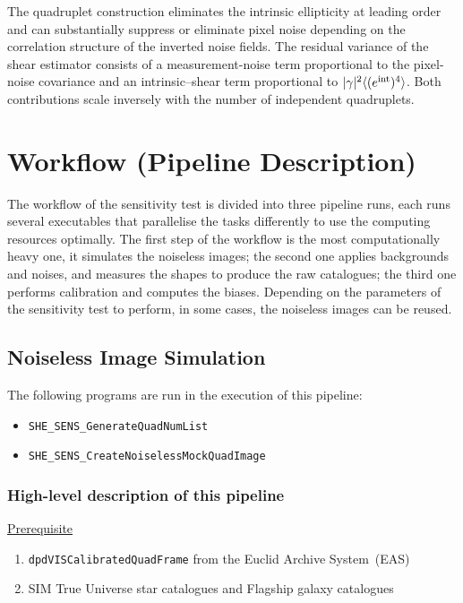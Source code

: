 \documentclass[11pt]{EuclidVIS}
\numberwithin{table}{section}
\numberwithin{figure}{section}
\begin{document}
The quadruplet construction eliminates the intrinsic ellipticity at leading
order and can substantially suppress or eliminate pixel noise depending on
the correlation structure of the inverted noise fields.
The residual variance of the shear estimator consists of a measurement-noise
term proportional to the pixel-noise covariance and an intrinsic--shear
term proportional to $|\gamma|^2\langle (e^{\rm int})^4\rangle$.
Both contributions scale inversely with the number of independent quadruplets.


\section{Workflow (Pipeline Description)}
\label{sec:workflow}
The workflow of the sensitivity test is divided into three pipeline runs, each runs several
executables that parallelise the tasks differently to use the computing resources optimally. The
first step of the workflow is the most computationally heavy one, it simulates the noiseless images;
the second one applies backgrounds and noises, and measures the shapes to produce the raw catalogues;
the third one performs calibration and computes the biases. Depending on the parameters of the
sensitivity test to perform, in some cases, the noiseless images can be reused.

\subsection{Noiseless Image Simulation}

The following programs are run in the execution of this pipeline:

\begin{itemize}
    \item \texttt{SHE\_SENS\_GenerateQuadNumList}
    \item \texttt{SHE\_SENS\_CreateNoiselessMockQuadImage}
\end{itemize}

\subsubsection{High-level description of this pipeline}

\underline{Prerequisite}
\begin{enumerate}
    \item \texttt{dpdVISCalibratedQuadFrame} from the Euclid Archive System~(EAS)
    \item SIM True Universe star catalogues and Flagship galaxy catalogues
\end{enumerate}
\end{document}
